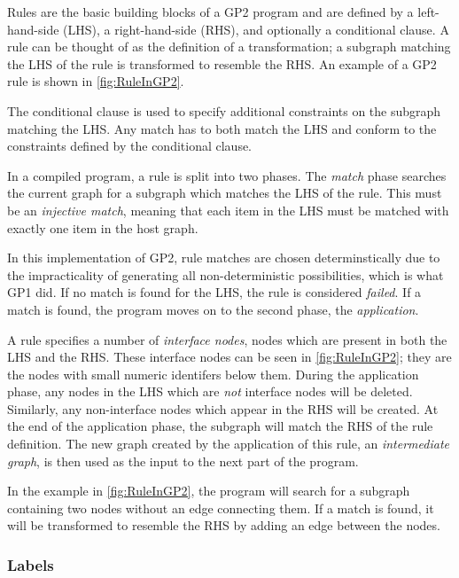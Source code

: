 \documentclass[authoryearcitations]{UoYCSproject}
\begin{document}
Rules are the basic building blocks of a GP2 program and are defined by a
left-hand-side (LHS), a right-hand-side (RHS), and optionally a conditional
clause. A rule can be thought of as the definition of a transformation; a subgraph
matching the LHS of the rule is transformed to resemble the RHS. An example of a
GP2 rule is shown in \autoref{fig:RuleInGP2}.

The conditional clause is used to specify additional constraints on the subgraph
matching the LHS. Any match has to both match the LHS and conform to the constraints
defined by the conditional clause.

In a compiled program, a rule is split into two phases. The \emph{match} phase
searches the current graph for a subgraph which matches the LHS of the rule. This must
be an \emph{injective match}, meaning that each item in the LHS must be matched with
exactly one item in the host graph.

In this implementation of GP2, rule matches are chosen determinstically due to the
impracticality of generating all non-deterministic possibilities, which is what GP1 did.
If no match is found for the LHS, the rule is considered \emph{failed}. If a match is
found, the program moves on to the second phase, the \emph{application}.

A rule specifies a number of \emph{interface nodes}, nodes which are present in both
the LHS and the RHS. These interface nodes can be seen in \autoref{fig:RuleInGP2}; they
are the nodes with small numeric identifers below them. During the application phase,
any nodes in the LHS which are \emph{not} interface nodes will be deleted. Similarly,
any non-interface nodes which appear in the RHS will be created. At the end of the
application phase, the subgraph will match the RHS of the rule definition. The new
graph created by the application of this rule, an \emph{intermediate graph}, is then
used as the input to the next part of the program.

In the example in \autoref{fig:RuleInGP2}, the program will search for a subgraph
containing two nodes without an edge connecting them. If a match is found, it will
be transformed to resemble the RHS by adding an edge between the nodes.


\subsubsection{Labels}
\label{sec:Labels}
\end{document}
